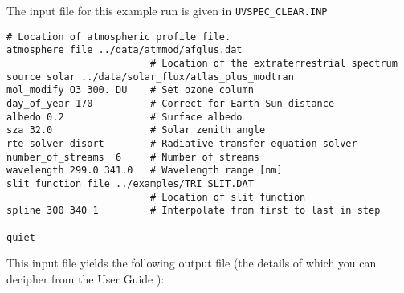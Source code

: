 The input file for this example run is given in \lstinline{UVSPEC_CLEAR.INP}

\begin{lstlisting}[style=tinysize]
                         # Location of atmospheric profile file. 
atmosphere_file ../data/atmmod/afglus.dat
                         # Location of the extraterrestrial spectrum
source solar ../data/solar_flux/atlas_plus_modtran
mol_modify O3 300. DU    # Set ozone column
day_of_year 170          # Correct for Earth-Sun distance
albedo 0.2               # Surface albedo
sza 32.0                 # Solar zenith angle
rte_solver disort        # Radiative transfer equation solver
number_of_streams  6     # Number of streams
wavelength 299.0 341.0   # Wavelength range [nm]
slit_function_file ../examples/TRI_SLIT.DAT
                         # Location of slit function
spline 300 340 1         # Interpolate from first to last in step

quiet
\end{lstlisting}

This input file yields the following output file (the details of which you can decipher from the \libradtran{} User Guide \cite{libRadTranUserGuide2019}):


